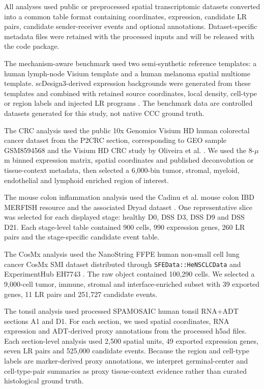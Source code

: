 \documentclass[referee,lineno,pdflatex,sn-vancouver-num]{sn-jnl}
\begin{document}
All analyses used public or preprocessed spatial transcriptomic datasets converted into a common table format containing coordinates, expression, candidate LR pairs, candidate sender-receiver events and optional annotations. Dataset-specific metadata files were retained with the processed inputs and will be released with the code package.

The mechanism-aware benchmark used two semi-synthetic reference templates: a human lymph-node Visium template and a human melanoma spatial multiome template. scDesign3-derived expression backgrounds were generated from these templates and combined with retained source coordinates, local density, cell-type or region labels and injected LR programs \citep{scdesign3}. The benchmark data are controlled datasets generated for this study, not native CCC ground truth.

The CRC analysis used the public 10x Genomics Visium HD human colorectal cancer dataset from the P2CRC section, corresponding to GEO sample GSM8594568 and the Visium HD CRC study by Oliveira et al. \citep{oliveira2025visiumhdcrc}. We used the 8-\(\mu\)m binned expression matrix, spatial coordinates and published deconvolution or tissue-context metadata, then selected a 6,000-bin tumor, stromal, myeloid, endothelial and lymphoid enriched region of interest.

The mouse colon inflammation analysis used the Cadinu et al. mouse colon IBD MERFISH resource and the associated Dryad dataset \citep{cadinu2024colitis,moffitt2024dryad}. One representative slice was selected for each displayed stage: healthy D0, DSS D3, DSS D9 and DSS D21. Each stage-level table contained 900 cells, 990 expression genes, 260 LR pairs and the stage-specific candidate event table.

The CosMx analysis used the NanoString FFPE human non-small cell lung cancer CosMx SMI dataset distributed through \texttt{SFEData::HeNSCLCData} and ExperimentHub EH7743 \citep{he2022cosmx,sfedata2026}. The raw object contained 100,290 cells. We selected a 9,000-cell tumor, immune, stromal and interface-enriched subset with 39 exported genes, 11 LR pairs and 251,727 candidate events.

The tonsil analysis used processed SPAMOSAIC human tonsil RNA+ADT sections A1 and D1. For each section, we used spatial coordinates, RNA expression and ADT-derived proxy annotations from the processed h5ad files. Each section-level analysis used 2,500 spatial units, 49 exported expression genes, seven LR pairs and 525,000 candidate events. Because the region and cell-type labels are marker-derived proxy annotations, we interpret germinal-center and cell-type-pair summaries as proxy tissue-context evidence rather than curated histological ground truth.
\end{document}
